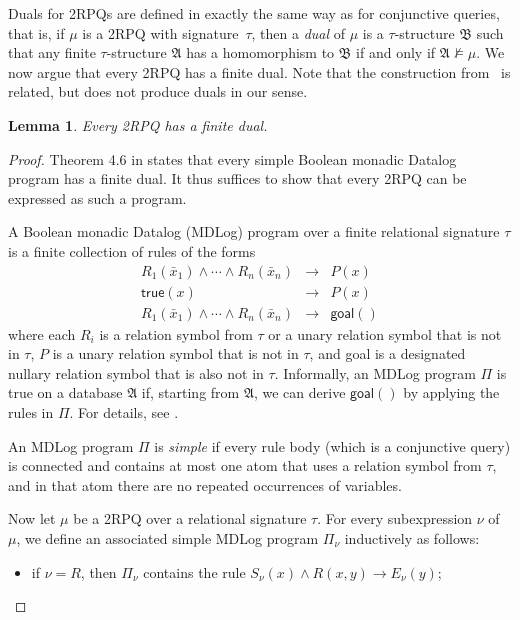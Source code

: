 \documentclass[nonacm]{acmart}
\newcommand{\bA}{{\mathfrak A}}
\newcommand{\bB}{{\mathfrak B}}
\newtheorem{lemma}[theorem]{Lemma}
\begin{document}
Duals for 2RPQs are defined in exactly the same way as for conjunctive queries, that is, if $\mu$ is a 2RPQ with signature~$\tau$, then a
    \emph{dual} of $\mu$ is a $\tau$-structure $\bB$ such
     that any finite $\tau$-structure $\bA$ has a homomorphism to $\bB$ if
     and only if $\bA \not \models \mu$. We now argue that every 2RPQ has a finite dual.
Note that the construction from~\cite{CalvaneseDegiocomoLenzeriniVardi}
is related, but does not produce duals in our
sense.
%
\begin{lemma}
  \label{lem:finitedual-2RPQ}
  Every  2RPQ has a finite dual.
\end{lemma}
%
\begin{proof}
Theorem 4.6 in \cite{OBDA} states that every simple Boolean monadic Datalog program has a finite dual.
It thus suffices to show that every 2RPQ can
 be expressed as such a program.

A Boolean monadic Datalog (MDLog)
program over a finite relational signature $\tau$ is a finite collection of rules of the forms
%
$$
\begin{array}{rcl}
R_1(\bar{x}_1) \wedge \cdots \wedge R_n(\bar{x}_n)  &\rightarrow& P(x)\\[1mm]
 \textsf{true}(x) &\rightarrow& P(x)\\[1mm]
R_1(\bar{x}_1) \wedge \cdots \wedge
R_n(\bar{x}_n)  &\rightarrow& \textsf{goal}()
\end{array}
$$
%
where each $R_i$ is a relation symbol from $\tau$ or a unary relation symbol that is not in $\tau$,  $P$ is a unary relation symbol that is not in $\tau$, and \textsf{goal} is a designated nullary relation symbol that is also not in $\tau$. Informally,
an MDLog program $\Pi$ is true on a database 
$\mathfrak{A}$ if, starting from $\mathfrak{A}$,
we can derive $\textsf{goal}()$ by applying the rules in $\Pi$. For details, see \cite{DBLP:books/aw/AbiteboulHV95}.

An MDLog program $\Pi$ is \emph{simple} if every rule body (which is a conjunctive query) is connected and
contains at most one atom that uses a relation symbol from $\tau$, and in that atom there are no
repeated occurrences of variables. 
  
Now let $\mu$ be a 2RPQ over a relational signature $\tau$.  For every subexpression $\nu$ of
$\mu$, we define an associated simple MDLog program $\Pi_\nu$ inductively as
follows:
  \begin{itemize}
   \item if $\nu=R$, then $\Pi_\nu$ contains the rule $S_\nu(x) \wedge
     R(x,y) \rightarrow E_\nu(y)$;


\end{itemize}
\end{proof}
\end{document}

